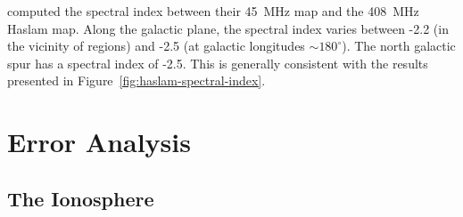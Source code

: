 \begin{bibunit}
\citet{2011A&A...525A.138G} computed the spectral index between their 45~MHz map and the 408~MHz
Haslam map. Along the galactic plane, the spectral index varies between -2.2 (in the vicinity of
 regions) and -2.5 (at galactic longitudes $\sim 180^\circ$). The north galactic spur has
a spectral index of -2.5. This is generally consistent with the results presented in
Figure~\ref{fig:haslam-spectral-index}.

\section{Error Analysis}\label{sec:error}

\subsection{The Ionosphere}\label{sec:ionosphere}


\end{bibunit}
